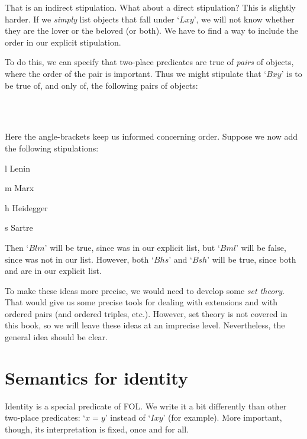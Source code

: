 That is an indirect stipulation. What about a direct stipulation? This is slightly harder. If we \emph{simply} list objects that fall under `$Lxy$', we will not know whether they are the lover or the beloved (or both). We have to find a way to include the order in our explicit stipulation. 

To do this, we can specify that two-place predicates are true of \emph{pairs} of objects, where the order of the pair is important. Thus we might stipulate that `$Bxy$' is to be true of, and only of, the following pairs of objects:
	\begin{center}
		\\
		\\
	\end{center}
Here the angle-brackets keep us informed concerning order. Suppose we now add the following stipulations:
	\begin{ekey}
		\item[l] Lenin
		\item[m] Marx
		\item[h] Heidegger
		\item[s] Sartre
	\end{ekey}
Then `$Blm$' will be true, since  was in our explicit list, but `$Bml$' will be false, since  was not in our list. However, both `$Bhs$' and `$Bsh$' will be true, since both  and  are in our explicit list.

To make these ideas more precise, we would need to develop some \emph{set theory}. That would give us some precise tools for dealing with extensions and with ordered pairs (and ordered triples, etc.). However, set theory is not covered in this book, so we will leave these ideas at an imprecise level. Nevertheless, the general idea should be clear.


\section{Semantics for identity}
Identity is a special predicate of FOL. We write it a bit differently than other two-place predicates: `$x=y$' instead of `$Ixy$' (for example). More important, though, its interpretation is fixed, once and for all. 

